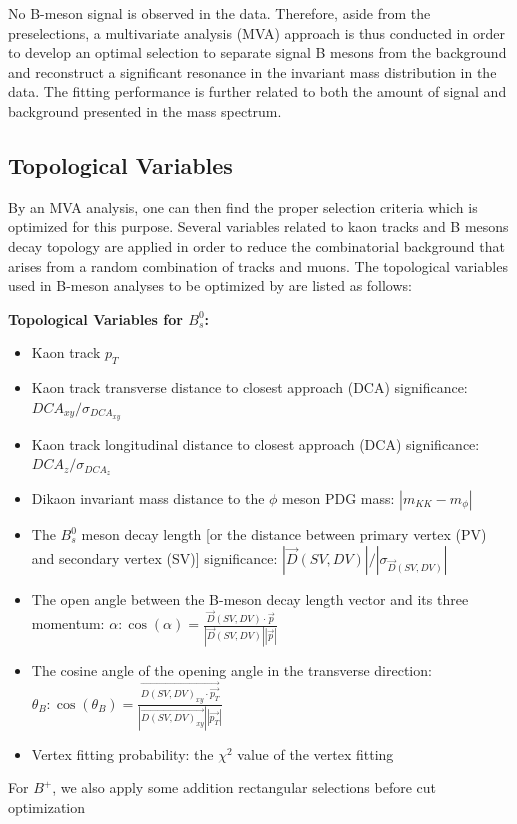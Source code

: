 No B-meson signal is observed in the data. Therefore, aside from the preselections, a multivariate analysis (MVA) approach \cite{MVARef} is thus conducted in order to develop an optimal selection to separate signal B mesons from the background and reconstruct a significant resonance in the invariant mass distribution in the data. The fitting performance is further related to both the amount of signal and background presented in the mass spectrum. 


\subsection{Topological Variables}


By an MVA analysis, one can then find the proper selection criteria which is optimized for this purpose. Several variables related to kaon tracks and B mesons decay topology are applied in order to reduce the combinatorial background that arises from a random combination of tracks and muons. The topological variables used in B-meson analyses to be optimized by  are listed as follows:

\textbf{Topological Variables for $B^0_s$:}
\begin{itemize}
\item Kaon track $p_T$
\item Kaon track transverse distance to closest approach (DCA) significance: $DCA_{xy}/\sigma_{DCA_{xy}}$ 
\item Kaon track longitudinal distance to closest approach (DCA) significance: $DCA_{z}/\sigma_{DCA_{z}}$
\item Dikaon invariant mass distance to the $\phi$ meson PDG mass: $|m_{KK} - m_{\phi}|$
\item The $B^0_s$ meson decay length [or the distance between primary vertex (PV) and secondary vertex (SV)] significance: $|\vec{D}(SV,DV)|/|\sigma_{\vec{D}(SV,DV)}|$
\item The open angle between the B-meson decay length vector and its three momentum: $\alpha: \cos(\alpha) = \frac{\vec{D}(SV,DV) \cdot \vec{p}}{|\vec{D}(SV,DV)||\vec{p}|}$
\item The cosine angle of the opening angle in the transverse direction:  $\theta_B: \cos(\theta_B) = \frac{\vec{D(SV,DV)_{xy} \cdot \vec{p_T}}}{|\vec{D(SV,DV)_{xy}}||\vec{p_T}|}$
\item Vertex fitting probability: the $\chi^2$ value of the vertex fitting
\end{itemize}

For $B^+$, we also apply some addition rectangular selections before cut optimization

